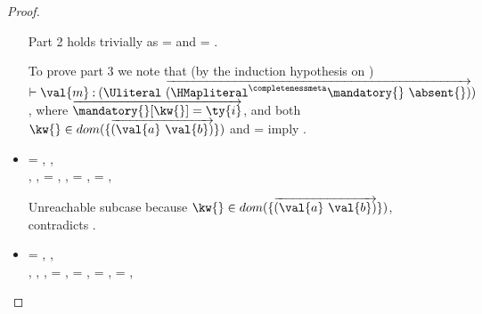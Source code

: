 \begin{lemma}
\begin{proof}
\begin{case}[B-Get]
\begin{itemize}
\begin{subcase}[T-GetHMap]
         Part 2 holds trivially as \thenprop{\prop{}} = {\topprop{}}
         and \elseprop{\prop{}} = {\topprop{}}.

         To prove part 3 we note that (by the induction hypothesis on )
         $\judgementtwo{}{\val{m}}{\Unionsplice{\overrightarrow {\HMapgeneric {\mandatory{}} {\absent{}}}}}$,
         where $\overrightarrow{\inmandatory{\kw{}}{\ty{i}}{\mandatory{}}}$, and 
         both
         $\keyinmap{\kw{}}{\curlymap{\overrightarrow{({\val{a}}\ {\val{b}})}}}$
         and
          {\kw{}} = {\val{}}
         imply .

      \end{subcase}
    \item[]
      \begin{subcase}[T-GetHMapAbsent]
  \ep{} = { {}},
  \judgementtworewrite {\propenv{}} {} {} {},
  \\
  \judgementrewrite {\propenv{}} {} {\HMapgeneric {\mandatory{}} {\absent}}
           { {}}
           {}
           {},
  {\inabsent{\kw{}}{\absent{}}},
  \e{} = { {}},
  \issubtypein{}{\Nil}{\ty{}},
  \thenprop{\prop{}} = {\topprop{}},
  \elseprop{\prop{}} = {\topprop{}},
                        {\object{}}

       Unreachable subcase because 
         $\keyinmap{\kw{}}{\curlymap{\overrightarrow{({\val{a}}\ {\val{b}})}}}$,
         contradicts
                {\inabsent{\kw{}}{\absent{}}}.
      \end{subcase}
    \item[]
      \begin{subcase}[T-GetHMapPartialDefault]
  \ep{} = { {}},
  \judgementtworewrite {\propenv{}} {} {}{},
  \\
 \judgementrewrite {\propenv{}} {} {\HMapp {\mandatory{}} {\absent}}
           { {}}
           {}
           {},
             {\notinmandatory{\kw{}}{\ty{}}{\mandatory{}}},
             {\notinabsent{\kw{}}{\absent{}}},
  \e{} = { {}},
  \ty{} = \Top,
  \thenprop{\prop{}} = {\topprop{}},
  \elseprop{\prop{}} = {\topprop{}},


\end{subcase}
\end{itemize}
\end{case}
\end{proof}
\end{lemma}
